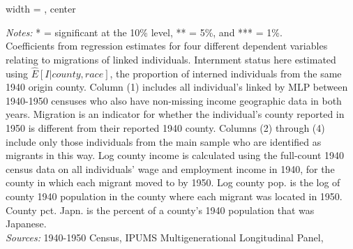 \begin{table}[htbp]
\begin{adjustbox}{width = \textwidth, center}
   \end{adjustbox}
   {\footnotesize
   \emph{Notes:}
   * = significant at the 10\% level,
   ** = 5\%, and
   *** = 1\%. \\
   Coefficients from regression estimates for four different
   dependent variables relating to migrations of linked individuals.
   Internment status here estimated using $\hat{E}[I|county, race]$,
   the proportion of interned individuals from the same 1940 origin county.
   Column (1) includes all individual's linked by MLP between 1940-1950 censuses
   who also have non-missing income geographic data in both years.
   Migration is an indicator for whether the individual's county reported in 1950
   is different from their reported 1940 county.
   Columns (2) through (4) include only those individuals from the main sample
   who are identified as migrants in this way.
   Log county income is calculated using the full-count 1940 census data
   on all individuals' wage and employment income in 1940,
   for the county in which each migrant moved to by 1950.
   Log county pop. is the log of county 1940 population
   in the county where each migrant was located in 1950.
   County pct. Japn. is the percent of a county's 1940 population
   that was Japanese. \\
   \emph{Sources:} 1940-1950 Census, IPUMS Multigenerational Longitudinal Panel,
   }
\end{table}